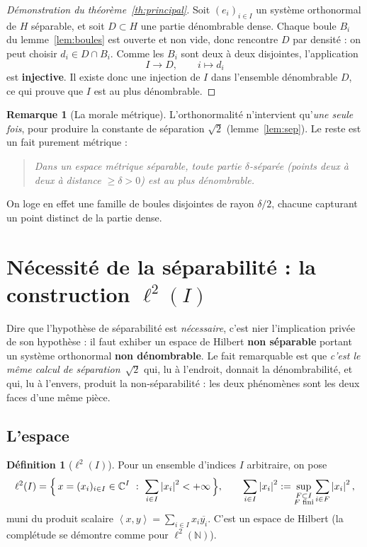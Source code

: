 \documentclass[11pt,a4paper]{article}
\theoremstyle{plain}
\theoremstyle{definition}
\newtheorem{definition}[theoreme]{Définition}
\newtheorem{remarque}[theoreme]{Remarque}
\newcommand{\C}{\mathbb{C}}
\newcommand{\N}{\mathbb{N}}
\newcommand{\HH}{H}
\newcommand{\abs}[1]{\left\lvert #1 \right\rvert}
\newcommand{\scal}[2]{\left\langle #1 , #2 \right\rangle}
\begin{document}
\begin{proof}[Démonstration du théorème~\ref{th:principal}]
Soit $(e_i)_{i\in I}$ un système orthonormal de $\HH$ séparable, et soit
$D \subset \HH$ une partie dénombrable dense. Chaque boule $B_i$ du
lemme~\ref{lem:boules} est ouverte et non vide, donc rencontre $D$ par densité :
on peut choisir $d_i \in D \cap B_i$. Comme les $B_i$ sont deux à deux disjointes,
l'application
\[
  I \longrightarrow D, \qquad i \longmapsto d_i
\]
est \textbf{injective}. Il existe donc une injection de $I$ dans l'ensemble
dénombrable $D$, ce qui prouve que $I$ est au plus dénombrable.
\end{proof}

\begin{remarque}[La morale métrique]
L'orthonormalité n'intervient qu'\emph{une seule fois}, pour produire la
constante de séparation $\sqrt2$ (lemme~\ref{lem:sep}). Le reste est un fait
purement métrique :
\begin{quote}
\itshape
Dans un espace métrique séparable, toute partie $\delta$-séparée
(points deux à deux à distance $\ge \delta > 0$) est au plus dénombrable.
\end{quote}
On loge en effet une famille de boules disjointes de rayon $\delta/2$, chacune
capturant un point distinct de la partie dense.
\end{remarque}

\section{Nécessité de la séparabilité : la construction \texorpdfstring{$\ell^2(I)$}{l2(I)}}

Dire que l'hypothèse de séparabilité est \emph{nécessaire}, c'est nier
l'implication privée de son hypothèse : il faut exhiber un espace de Hilbert
\textbf{non séparable} portant un système orthonormal \textbf{non dénombrable}.
Le fait remarquable est que \emph{c'est le même calcul de séparation~$\sqrt2$}
qui, lu à l'endroit, donnait la dénombrabilité, et qui, lu à l'envers, produit la
non-séparabilité : les deux phénomènes sont les deux faces d'une même pièce.

\subsection{L'espace}

\begin{definition}[$\ell^2(I)$]
Pour un ensemble d'indices $I$ arbitraire, on pose
\[
  \ell^2(I) = \Bigl\{\, x = (x_i)_{i\in I} \in \C^{I} \ :\
    \sum_{i\in I} \abs{x_i}^2 < +\infty \,\Bigr\},
  \qquad
  \sum_{i\in I} \abs{x_i}^2 := \sup_{\substack{F \subset I \\ F \text{ fini}}}
    \sum_{i\in F} \abs{x_i}^2,
\]
muni du produit scalaire $\scal{x}{y} = \sum_{i\in I} x_i \overline{y_i}$.
C'est un espace de Hilbert (la complétude se démontre comme pour
$\ell^2(\N)$).
\end{definition}
\end{document}
